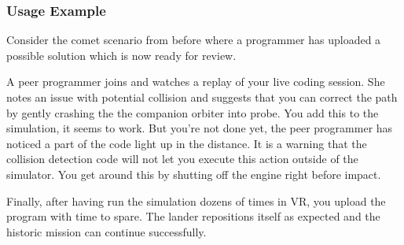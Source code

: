 \documentclass[conference]{IEEEtran}
\begin{document}
\subsubsection{Usage Example}

Consider the comet scenario from before where a programmer has uploaded a possible solution which is now ready for review.


A peer programmer joins and watches a replay of your live coding session.  
She notes an issue with potential collision and suggests that you can correct the path by gently crashing the the companion orbiter into probe.  
You add this to the simulation, it seems to work.  
But you're not done yet, the peer programmer has noticed a part of the code light up in the distance.
It is a warning that the collision detection code will not let you execute this action outside of the simulator.  
You get around this by shutting off the engine right before impact.

Finally, after having run the simulation dozens of times in VR, you upload the program with time to spare. 
The lander repositions itself as expected and the historic mission can continue successfully.



  




\end{document}
